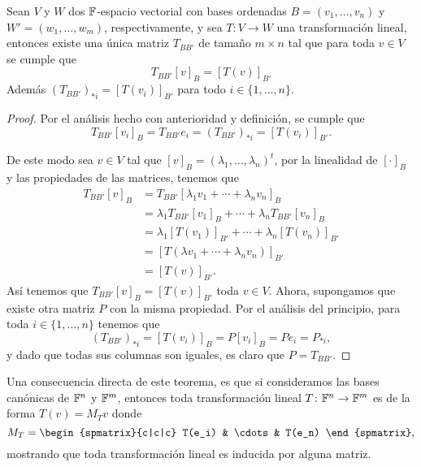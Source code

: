 \begin{teor} \label{teor:MatTrLin}
  Sean $V$ y $W$ dos $\mathbb{F}$-espacio vectorial con bases ordenadas $B = (v_1,\ldots,v_n)$ y $W' = (w_1,\ldots,w_m)$, respectivamente, y sea $T\colon V \to W$ una transformación lineal, entonces existe una única matriz $T_{BB'}$ de tamaño $m\times n$ tal que para toda $v \in V$ se cumple que
    \[ T_{BB'} [v]_B = [T(v)]_{B'} \]
  Además $(T_{BB'})_{*i} = [T(v_i)]_{B'}$ para todo $i \in \{1,\ldots,n\}$.
\end{teor}
\begin{proof}
  Por el análisis hecho con anterioridad y definición, se cumple que
  \[ T_{BB'} [v_i]_B = T_{BB'} e_i = (T_{BB'})_{*i} = [T(v_i)]_{B'}. \]
  
  De este modo sea $v \in V$ tal que $[v]_B = (\lambda_1,\ldots,\lambda_n)^t$, por la linealidad de $[\cdot]_B$ y las propiedades de las matrices, tenemos que
  \begin{align*}
    T_{BB'}[v]_B &= T_{BB'}[\lambda_1v_1 + \cdots + \lambda_n v_n]_B \\
      &= \lambda_1 T_{BB'} [v_1]_B + \cdots + \lambda_n T_{BB'} [v_n]_B \\
      &= \lambda_1 [T(v_1)]_{B'} + \cdots + \lambda_n [T(v_n)]_{B'} \\
      &= [T(\lambda v_1  + \cdots + \lambda_n v_n )]_{B'} \\
      &= [T(v)]_{B'}.
  \end{align*}
  Así tenemos que $T_{BB'} [v]_B = [T(v)]_{B'}$ toda $v \in V$. Ahora, supongamos que existe otra matriz $P$ con la misma propiedad. Por el análisis del principio, para toda $i \in \{1,\ldots,n\}$ tenemos que
  \[ (T_{BB'})_{*i} = [T(v_i)]_B = P[v_i]_B = Pe_i = P_{*i}, \]
  y dado que todas sus columnas son iguales, es claro que $P = T_{BB'}$.
\end{proof}

Una consecuencia directa de este teorema, es que si consideramos las bases canónicas de $\mathbb{F}^n$ y $\mathbb{F}^m$, entonces toda transformación lineal $T\colon \mathbb{F}^n \to \mathbb{F}^m$ es de la forma $T(v) = M_T v$ donde
  \[ M_T = \begin{spmatrix}{c|c|c} T(e_i) & \cdots & T(e_n) \end{spmatrix}, \]
mostrando que toda transformación lineal es inducida por alguna matriz.

